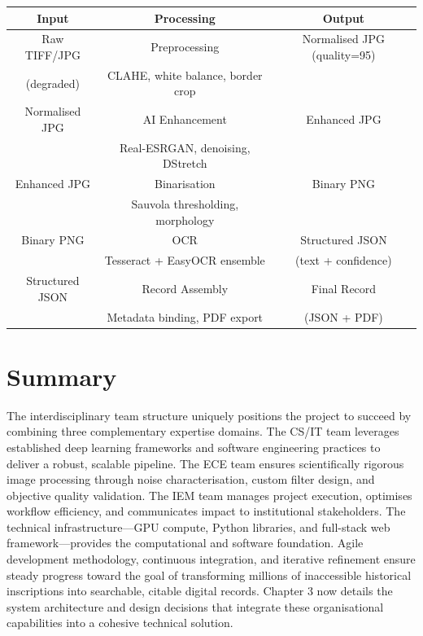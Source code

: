 \begin{center}
\begin{tabular}{|c|c|c|}
	\hline
	Input & Processing & Output \\
	\hline
	Raw TIFF/JPG & Preprocessing & Normalised JPG (quality=95) \\
	(degraded) & CLAHE, white balance, border crop & \\
	\hline
	Normalised JPG & AI Enhancement & Enhanced JPG \\
	& Real-ESRGAN, denoising, DStretch & \\
	\hline
	Enhanced JPG & Binarisation & Binary PNG \\
	& Sauvola thresholding, morphology & \\
	\hline
	Binary PNG & OCR & Structured JSON \\
	& Tesseract + EasyOCR ensemble & (text + confidence) \\
	\hline
	Structured JSON & Record Assembly & Final Record \\
	& Metadata binding, PDF export & (JSON + PDF) \\
	\hline
\end{tabular}
\end{center}

\section{Summary}

The interdisciplinary team structure uniquely positions the project to succeed by combining three complementary expertise domains. The CS/IT team leverages established deep learning frameworks and software engineering practices to deliver a robust, scalable pipeline. The ECE team ensures scientifically rigorous image processing through noise characterisation, custom filter design, and objective quality validation. The IEM team manages project execution, optimises workflow efficiency, and communicates impact to institutional stakeholders. The technical infrastructure—GPU compute, Python libraries, and full-stack web framework—provides the computational and software foundation. Agile development methodology, continuous integration, and iterative refinement ensure steady progress toward the goal of transforming millions of inaccessible historical inscriptions into searchable, citable digital records. Chapter 3 now details the system architecture and design decisions that integrate these organisational capabilities into a cohesive technical solution.

